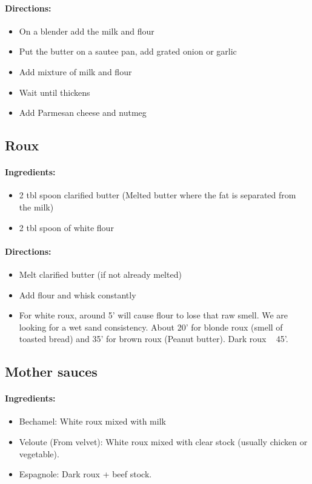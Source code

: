 \documentclass{article}
\begin{document}
\paragraph{Directions:}
\begin{itemize}
	\item On a blender add the milk and flour
	\item Put the butter on a sautee pan, add grated onion or garlic
	\item Add mixture of milk and flour
	\item Wait until thickens
	\item Add Parmesan cheese and nutmeg
\end{itemize}

\subsection{Roux}

\paragraph{Ingredients:}

\begin{itemize}
	\item 2 tbl spoon clarified butter (Melted butter where the fat is separated from the milk)
	\item 2 tbl spoon of white flour
\end{itemize}

\paragraph{Directions:}
\begin{itemize}
	\item Melt clarified butter (if not already melted)
	\item Add flour and whisk constantly
	\item For white roux, around 5' will cause flour to lose that raw smell. We are looking for a wet sand consistency. About 20' for blonde roux (smell of toasted bread) and 35' for brown roux (Peanut butter). Dark roux ~ 45'.
\end{itemize}

\subsection{Mother sauces}

\paragraph{Ingredients:}
\begin{itemize}
	\item Bechamel: White roux mixed with milk
	\item Veloute (From velvet): White roux mixed with clear stock (usually chicken or vegetable).
	\item Espagnole: Dark roux + beef stock.
\end{itemize}
\end{document}
